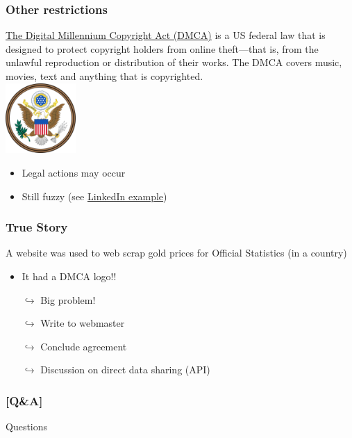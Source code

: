 \documentclass[xcolor=x11names, aspectratio=169, compress]{beamer}
\renewcommand{\(}{\begin{columns}}
\renewcommand{\)}{\end{columns}}
\newcommand{\<}[1]{\begin{column}{#1}}
\renewcommand{\>}{\end{column}}
\begin{document}
\begin{frame}
    \frametitle{Other restrictions}
    \begin{center}
\href{https://en.wikipedia.org/wiki/Digital_Millennium_Copyright_Act}{The Digital Millennium Copyright Act (DMCA)}  is a US federal law that is designed to protect copyright holders from online theft—that is, from the unlawful reproduction or distribution of their works. The DMCA covers music, movies, text and anything that is copyrighted. \\
  \includegraphics[width = 0.2\textwidth]{DMCA_logo.png}
    \end{center}

\pause
    \begin{itemize}[<+->]
        \item Legal actions may occur
        \item Still fuzzy (see \href{https://www.jdsupra.com/legalnews/data-scraping-deemed-legal-in-certain-5923866/}{LinkedIn example})
    \end{itemize}
\end{frame}


\begin{frame}
    \frametitle{True Story}
A website was used to web scrap gold prices for Official Statistics (in a country)
\pause
    \begin{itemize}[<+->]
        \item It had a DMCA logo!!
       \item[$\hookrightarrow$] Big problem!
       \item[$\hookrightarrow$] Write to webmaster
       \item[$\hookrightarrow$] Conclude agreement
       \item[$\hookrightarrow$] Discussion on direct data sharing (API)
    \end{itemize}
\end{frame}


\begin{frame} %
\frametitle{\textcolor{brique}{[Q\&A]}}
\begin{center}
\Large \textcolor{siap}{ Questions}
\end{center}
\end{frame}
\end{document}
